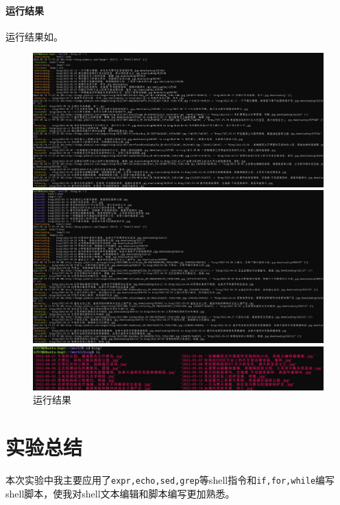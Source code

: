 \documentclass[lang=cn,11pt,a4paper,cite=authornum]{paper}
\begin{document}
\paragraph{运行结果}

运行结果如。

\begin{figure}[!htb]
    \centering
    \includegraphics[width=\textwidth]{./images/l3-p5.jpg}

    \includegraphics[width=\textwidth]{./images/l3-p6.jpg}

    \includegraphics[width=\textwidth]{./images/l3-p7.jpg}
    \caption{运行结果\label{fig:p5}}
\end{figure}

\section{实验总结}

本次实验中我主要应用了\texttt{expr,echo,sed,grep}等shell指令和\texttt{if,for,while}编写shell脚本，使我对shell文本编辑和脚本编写更加熟悉。
\end{document}
